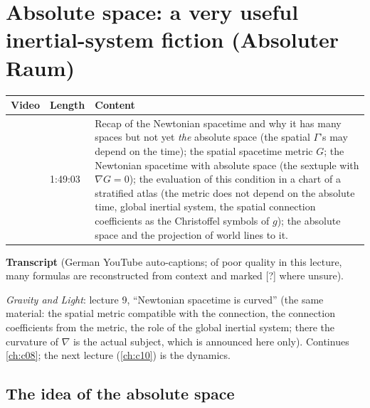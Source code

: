 \chapter{Absolute space: a very useful inertial-system fiction (Absoluter Raum)}\label{ch:c09}
\begin{paracol}{2}

\begin{sources}
\begin{tabularx}{\linewidth}{@{}l l L@{}}
\toprule
\textbf{Video} & \textbf{Length} & \textbf{Content}\\
\midrule
{} & 1:49:03 & Recap of the Newtonian spacetime and why it has many
spaces but not yet \emph{the} absolute space (the spatial $\Gamma$'s may depend on the time); the spatial spacetime metric $G$; the Newtonian spacetime with absolute
space (the sextuple with $\nabla G=0$); the evaluation of this condition in a chart of a stratified atlas (the metric does not depend on the absolute time,
global inertial system, the spatial connection coefficients as the Christoffel symbols of $g$); the absolute space and the projection of
world lines to it.\\
\bottomrule
\end{tabularx}

\smallskip
\textbf{Transcript}  (German YouTube auto-captions; of poor quality in this lecture, many formulas are
reconstructed from context and marked [?] where unsure).
\end{sources}

\begin{reading}
\emph{Gravity and Light}: lecture 9, ``Newtonian spacetime is curved'' (the same material: the spatial metric compatible with the connection, the connection coefficients from the metric, the
role of the global inertial system; there the curvature of $\nabla$ is the actual subject, which is announced here only). Continues \cref{ch:c08}; the next lecture
(\cref{ch:c10}) is the dynamics.
\end{reading}

\section{The idea of the absolute space}\label{sec:as-idea}


\end{paracol}
